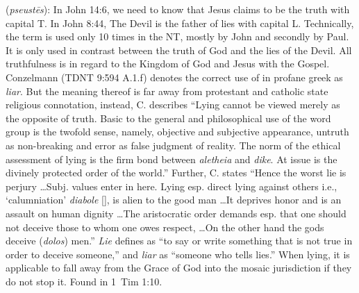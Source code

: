 \item[Liar,]

(\textit{pseustēs}):
In John 14:6, we need to know that Jesus claims to be the truth with capital T. In John 8:44, The Devil is the father of lies with capital L. Technically, the term  is used only 10 times in the NT, mostly by John and secondly by Paul. It is only used in contrast between the truth of God and the lies of the Devil. All truthfulness is in regard to the Kingdom of God and Jesus with the Gospel. Conzelmann (TDNT 9:594 A.1.f) denotes the correct use of  in profane greek as \emph{liar}. But the meaning thereof is far away from protestant and catholic state religious connotation, instead, C. describes ``Lying cannot be viewed merely as the opposite of truth. Basic to the general and philosophical use of the word group is the twofold sense, namely, objective and subjective appearance, untruth as non-breaking and error as false judgment of reality. The norm of the ethical assessment of lying is the firm bond between \emph{aletheia} and \emph{dike}. At issue is the divinely protected order of the world.'' Further, C. states ``Hence the worst lie is perjury \ldots Subj. values enter in here. Lying esp. direct lying against others i.e., `calumniation' \emph{diabole} [], is alien to the good man \ldots It deprives honor and is an assault on human dignity \ldots The aristocratic order demands esp. that one should not deceive those to whom one owes respect, \ldots On the other hand the gods deceive (\emph{dolos}) men.'' \emph{Lie} defines as ``to say or write something that is not true in order to deceive someone,'' and \emph{liar} as ``someone who tells lies.'' When lying, it is applicable to fall away from the Grace of God into the mosaic jurisdiction if they do not stop it.
Found in 1~Tim 1:10.
